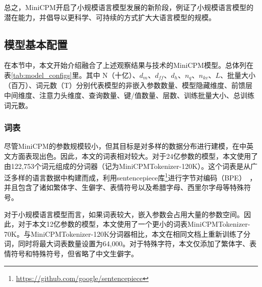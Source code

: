 总之，MiniCPM开启了小规模语言模型发展的新阶段，例证了小规模语言模型的潜在能力，并倡导以更科学、可持续的方式扩大大语言模型的规模。 



\subsection{模型基本配置}
在本节中，本文开始介绍融合了上述观察结果与技术的MiniCPM模型。总体列在表\ref{tab:model_configs}里。其中 N（十亿）、$d_m$、$d_{ff}$、$d_h$、$n_q$、$n_{kv}$、$L$、批量大小（百万）、词元数（T）分别代表模型的非嵌入参数数量、模型隐藏维度、前馈层中间维度、注意力头维度、查询数量、键/值数量、层数、训练批量大小、总训练词元数。
\label{sec:model}
\begin{table}[htbp]
    \centering
{}
    \caption{MiniCPM的模型配置}
    \label{tab:model_configs}
\end{table}

\subsubsection{词表}
尽管MiniCPM的参数规模较小，但其目标是对多样的数据分布进行建模，在中英文方面表现出色。因此，本文的词表相对较大。对于24亿参数的模型，本文使用了由122,753个词元组成的分词器（记为MiniCPMTokenizer-120K）。这个词表是从广泛多样的语言数据中构建而成，利用sentencepiece库\footnote{\url{https://github.com/google/sentencepiece}}进行字节对编码（BPE）~\citep{sennrich-etal-2016-neural}，并且包含了诸如繁体字、生僻字、表情符号以及希腊字母、西里尔字母等特殊符号。

对于小规模语言模型而言，如果词表较大，嵌入参数会占用大量的参数空间。因此，对于本文12亿参数的模型，本文使用了一个更小的词表MiniCPMTokenizer-70K。与MiniCPMTokenizer-120K分词器相比，本文在相同文档上重新训练了分词，同时将最大词表数量设置为64,000。对于特殊字符，本文仅添加了繁体字、表情符号和特殊符号，但省略了中文生僻字。

